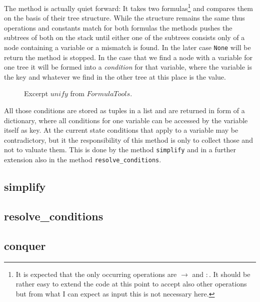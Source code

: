 The method is actually quiet forward: It takes two formulas\footnote{It is expected that the only occurring operations are $\rightarrow$ and $:$. It should be rather easy to extend the code at this point to accept also other operations but from what I can expect as input this is not necessary here.} and compares them on the basis of their tree structure. While the structure remains the same thus operations and constants match for both formulas the methods pushes the subtrees of both on the stack until either one of the subtrees consists only of a node containing a variable or a mismatch is found. In the later case \texttt{None} will be return the method is stopped. In the case that we find a node with a variable for one tree it will be formed into a \emph{condition} for that variable, where the variable is the key and whatever we find in the other tree at this place is the value.

\begin{figure}[H]
	\vspace{-10pt}
	
	\vspace{-10pt}
	\caption{Excerpt $unify$ from $FormulaTools$.}
	\vspace{-10pt}
\end{figure}

All those conditions are stored as tuples in a list and are returned in form of a dictionary, where all conditions for one variable can be accessed by the variable itself as key. At the current state conditions that apply to a variable may be contradictory, but it the responsibility of this method is only to collect those and not to valuate them. This is done by the method \texttt{simplify} and in a further extension also in the method \texttt{resolve\_conditions}.


\subsection{simplify}


\subsection{resolve\_conditions}


\subsection{conquer}


